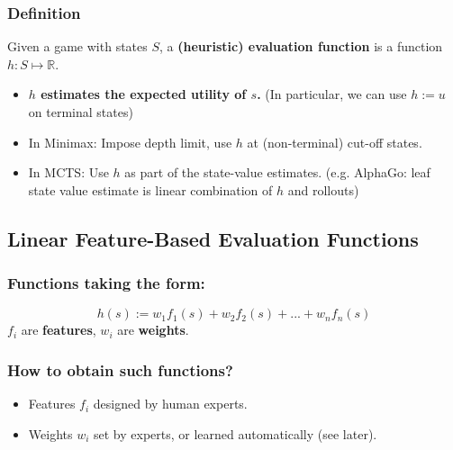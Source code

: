 \documentclass[conference]{styles/acmsiggraph}
\begin{document}
        \subsubsection{Definition}
            Given a game with states $S$, a \textbf{(heuristic) evaluation function} is a function $h : S \mapsto \mathbb{R}$.
                \begin{itemize}
                    \item \textbf{$h$ estimates the expected utility of $s$.}
                        (In particular, we can use $h := u$ on terminal states)
                    \item In Minimax: Impose depth limit, use $h$ at (non-terminal) cut-off states.
                    \item In MCTS: Use $h$ as part of the state-value estimates. 
                        (e.g. AlphaGo: leaf state value estimate is linear combination of $h$ and rollouts)
                \end{itemize}
        
    \subsection{Linear Feature-Based Evaluation Functions}
        \subsubsection{Functions taking the form:}
            $$h(s) := w_1f_1(s) + w_2f_2(s) + ... + w_nf_n(s)$$
            $f_i$ are \textbf{features}, $w_i$ are \textbf{weights}.
        
        \subsubsection{How to obtain such functions?}
            \begin{itemize}
                \item Features $f_i$ designed by human experts.
                \item Weights $w_i$ set by experts, or learned automatically (see later).
            \end{itemize}
    
\end{document}
